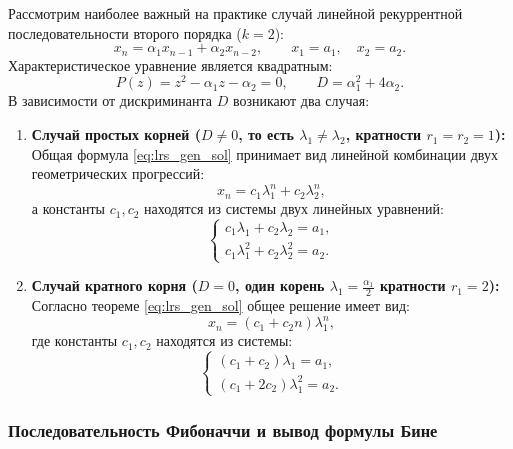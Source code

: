 Рассмотрим наиболее важный на практике случай линейной рекуррентной 
последовательности второго порядка ($k = 2$):
\[
    x_n = \alpha_1 x_{n-1} + \alpha_2 x_{n-2}, \qquad x_1 = a_1, \quad x_2 = a_2.
\]
Характеристическое уравнение является квадратным:
\[
    P(z) = z^2 - \alpha_1 z - \alpha_2 = 0, \qquad 
    D = \alpha_1^2 + 4\alpha_2.
\]
В зависимости от дискриминанта $D$ возникают два случая:
\begin{enumerate}
    \item \textbf{Случай простых корней ($D \neq 0$, то есть 
    $\lambda_1 \neq \lambda_2$, кратности $r_1 = r_2 = 1$):} 
    Общая формула \eqref{eq:lrs_gen_sol} принимает вид линейной комбинации 
    двух геометрических прогрессий:
    \begin{equation} \label{eq:lrs_ord2_diff}
        x_n = c_1 \lambda_1^n + c_2 \lambda_2^n, \tag{13}
    \end{equation}
    а константы $c_1, c_2$ находятся из системы двух линейных уравнений:
    \[
        \begin{cases}
            c_1 \lambda_1 + c_2 \lambda_2 = a_1, \\
            c_1 \lambda_1^2 + c_2 \lambda_2^2 = a_2.
        \end{cases}
    \]
    \item \textbf{Случай кратного корня ($D = 0$, один корень 
    $\lambda_1 = \frac{\alpha_1}{2}$ кратности $r_1 = 2$):} 
    Согласно теореме \eqref{eq:lrs_gen_sol} общее решение имеет вид:
    \begin{equation} \label{eq:lrs_ord2_mult}
        x_n = (c_1 + c_2 n) \lambda_1^n, \tag{14}
    \end{equation}
    где константы $c_1, c_2$ находятся из системы:
    \[
        \begin{cases}
            (c_1 + c_2) \lambda_1 = a_1, \\
            (c_1 + 2 c_2) \lambda_1^2 = a_2.
        \end{cases}
    \]
\end{enumerate}

\subsubsection{Последовательность Фибоначчи и вывод формулы Бине}

